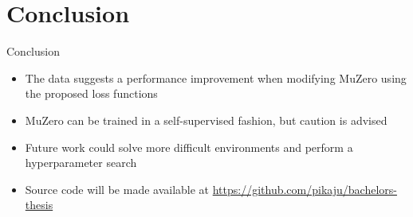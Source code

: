 \section{Conclusion}

\begin{frame}{Conclusion}
    \begin{itemize}
        \item The data suggests a performance improvement when modifying MuZero using the proposed loss functions
        \item MuZero can be trained in a self-supervised fashion, but caution is advised
        \item Future work could solve more difficult environments and perform a hyperparameter search
        \item Source code will be made available at \url{https://github.com/pikaju/bachelors-thesis}
    \end{itemize}
\end{frame}
